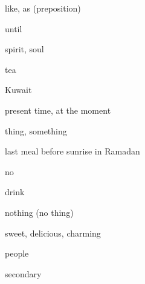 \begin{flashcard}{\LARGE like, as (preposition)}
\LARGE {}
\end{flashcard}
\begin{flashcard}{\LARGE until}
\LARGE {}
\end{flashcard}
\begin{flashcard}{\LARGE spirit, soul}
\LARGE {}
\end{flashcard}
\begin{flashcard}{\LARGE tea}
\LARGE {}
\end{flashcard}
\begin{flashcard}{\LARGE Kuwait}
\LARGE {}
\end{flashcard}
\begin{flashcard}{\LARGE present time, at the moment}
\LARGE {}
\end{flashcard}
\begin{flashcard}{\LARGE thing, something}
\LARGE {}
\end{flashcard}
\begin{flashcard}{\LARGE last meal before sunrise in Ramadan}
\LARGE {}
\end{flashcard}
\begin{flashcard}{\LARGE no}
\LARGE {}
\end{flashcard}
\begin{flashcard}{\LARGE drink}
\LARGE {}
\end{flashcard}
\begin{flashcard}{\LARGE nothing (no thing)}
\LARGE {}
\end{flashcard}
\begin{flashcard}{\LARGE sweet, delicious, charming}
\LARGE {}
\end{flashcard}
\begin{flashcard}{\LARGE people}
\LARGE {}
\end{flashcard}
\begin{flashcard}{\LARGE secondary}
\LARGE {}
\end{flashcard}

